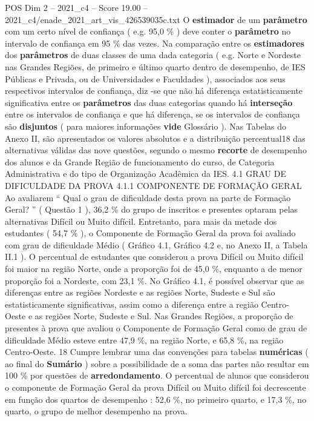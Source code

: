 \begin{textsample}{POS Dim 2 – 2021\_c4 – Score 19.00 – 2021\_c4/enade\_2021\_art\_vis\_426539035c.txt}
O \textbf{estimador} de um \textbf{parâmetro} com um certo nível de confiança ( e.g. 95,0 \% ) deve conter o \textbf{parâmetro} no intervalo de confiança em 95 \% das vezes.
Na comparação entre os \textbf{estimadores} dos \textbf{parâmetros} de duas classes de uma dada categoria ( e.g.
Norte e Nordeste nas Grandes Regiões, de primeiro e último quarto dentro de desempenho, de IES Públicas e Privada, ou de Universidades e Faculdades ), associados aos seus respectivos intervalos de confiança, diz -se que não há diferença estatisticamente significativa entre os \textbf{parâmetros} das duas categorias quando há \textbf{interseção} entre os intervalos de confiança e que há diferença, se os intervalos de confiança são \textbf{disjuntos} ( para maiores informações \textbf{vide} Glossário ).
Nas Tabelas do Anexo II, são apresentados os valores absolutos e a distribuição percentual18 das alternativas válidas das nove questões, segundo o mesmo \textbf{recorte} de desempenho dos alunos e da Grande Região de funcionamento do curso, de Categoria Administrativa e do tipo de Organização Acadêmica da IES. 4.1 GRAU DE DIFICULDADE DA PROVA 4.1.1 COMPONENTE DE FORMAÇÃO GERAL Ao avaliarem “ Qual o grau de dificuldade desta prova na parte de Formação Geral? ” ( Questão 1 ), 36,2 \% do grupo de inscritos e presentes optaram pelas alternativas Difícil ou Muito difícil.
Entretanto, para mais da metade dos estudantes ( 54,7 \% ), o Componente de Formação Geral da prova foi avaliado com grau de dificuldade Médio ( Gráfico 4.1, Gráfico 4.2 e, no Anexo II, a Tabela II.1 ).
O percentual de estudantes que considerou a prova Difícil ou Muito difícil foi maior na região Norte, onde a proporção foi de 45,0 \%, enquanto a de menor proporção foi a Nordeste, com 23,1 \%.
No Gráfico 4.1, é possível observar que as diferenças entre as regiões Nordeste e as regiões Norte, Sudeste e Sul são estatisticamente significativas, assim como a diferença entre a região Centro-Oeste e as regiões Norte, Sudeste e Sul.
Nas Grandes Regiões, a proporção de presentes à prova que avaliou o Componente de Formação Geral como de grau de dificuldade Médio esteve entre 47,9 \%, na região Norte, e 65,8 \%, na região Centro-Oeste. 18 Cumpre lembrar uma das convenções para tabelas \textbf{numéricas} ( ao final do \textbf{Sumário} ) sobre a possibilidade de a soma das partes não resultar em 100 \% por questões de \textbf{arredondamento}.
O percentual de alunos que considerou o componente de Formação Geral da prova Difícil ou Muito difícil foi decrescente em função dos quartos de desempenho : 52,6 \%, no primeiro quarto, e 17,3 \%, no quarto, o grupo de melhor desempenho na prova.

\end{textsample}
